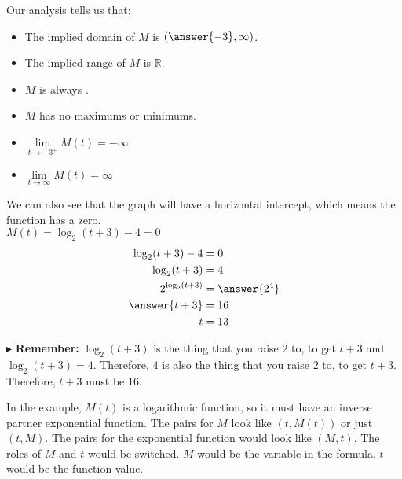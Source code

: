 \documentclass{ximera}
\begin{document}
\begin{example}
\begin{explanation}
Our analysis tells us that:

\begin{itemize}
\item The implied domain of $M$ is $\left( \answer{-3} ,\infty \right)$.
\item The implied range of $M$ is $\mathbb{R}$.
\item $M$ is always  .
\item $M$ has no maximums or minimums.
\item $\lim\limits_{t \to -3^+} M(t) = -\infty$
\item $\lim\limits_{t \to \infty} M(t) = \infty$
\end{itemize}




We can also see that the graph will have a horizontal intercept, which means the function has a zero. \\


$M(t) = \log_2(t+3) - 4 = 0$ \\


\begin{align*}
\log_2(t+3) - 4 & = 0 \\
\log_2(t+3) & = 4 \\
2^{\log_2(t+3)} & = \answer{2^4} \\
\answer{t+3} & = 16 \\
t & = 13
\end{align*}


$\blacktriangleright$ \textbf{Remember:} $\log_2(t+3)$ is the thing that you raise $2$ to, to get $t+3$ and $\log_2(t+3) = 4$.  Therefore, $4$ is also the thing that you raise $2$ to, to get $t+3$. Therefore, $t+3$ must be $16$.









\end{explanation}

\end{example}



In the example, $M(t)$ is a logarithmic function, so it must have an inverse partner exponential function.  The pairs for $M$ look like $(t, M(t))$ or just $(t,M)$. The pairs for the exponential function would look like $(M, t)$.  The roles of $M$ and $t$ would be switched. $M$ would be the variable in the formula. $t$ would be the function value.\\
\end{document}
